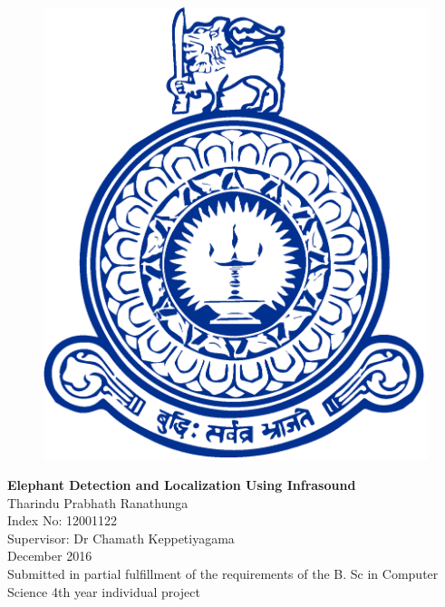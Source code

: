 \documentclass[12pt]{article}
\numberwithin{figure}{section}
\numberwithin{table}{section}
\begin{document}
 

\begin{titlepage}
\newcommand{\HRule}{\rule{\linewidth}{0.5mm}} %
\begin{figure}[H]
\centering
\includegraphics[scale=0.20]{logo}\\[1cm]
\end{figure}
\center 
{ \LARGE \bfseries Elephant Detection and Localization Using Infrasound}\\[1.5cm]
\Large Tharindu Prabhath Ranathunga\\
\Large Index No: 12001122\\[1cm]
\Large Supervisor: Dr Chamath Keppetiyagama\\[1cm]
\Large December 2016\\[1.5cm]
\large Submitted in partial fulfillment of the requirements of the B. Sc in Computer Science 4th year individual project\\[0.5cm] 

\end{titlepage}
\end{document}
